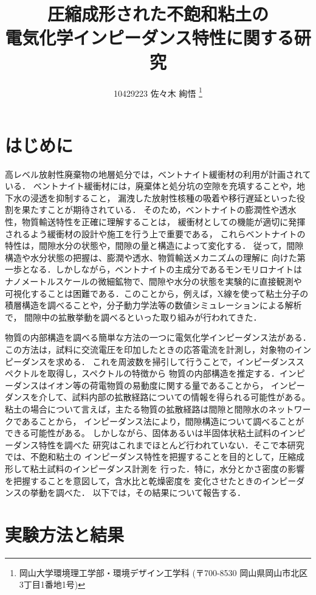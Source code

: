 \documentclass{jsce}
\title{
圧縮成形された不飽和粘土の\\
電気化学インピーダンス特性に関する研究
}%
\author{
10429223 佐々木 絢悟
\thanks{岡山大学環境理工学部・環境デザイン工学科 (〒700-8530 岡山県岡山市北区3丁目1番地1号)}
}
\begin{document}
\maketitle
\section{はじめに}
高レベル放射性廃棄物の地層処分では，ベントナイト緩衝材の利用が計画されている．
ベントナイト緩衝材には，廃棄体と処分坑の空隙を充填することや，地下水の浸透を抑制すること，
漏洩した放射性核種の吸着や移行遅延といった役割を果たすことが期待されている．
そのため，ベントナイトの膨潤性や透水性，物質輸送特性を正確に理解することは，
緩衝材としての機能が適切に発揮されるよう緩衝材の設計や施工を行う上で重要である，
これらベントナイトの特性は，間隙水分の状態や，間隙の量と構造によって変化する．
従って，間隙構造や水分状態の把握は、膨潤や透水、物質輸送メカニズムの理解に
向けた第一歩となる．しかしながら，ベントナイトの主成分であるモンモリロナイトは
ナノメートルスケールの微細鉱物で、間隙や水分の状態を実験的に直接観測や
可視化することは困難である．このことから，例えば，X線を使って粘土分子の
積層構造を調べることや，分子動力学法等の数値シミュレーションによる解析で，
間隙中の拡散挙動を調べるといった取り組みが行われてきた．

 物質の内部構造を調べる簡単な方法の一つに電気化学インピーダンス法がある．
この方法は，試料に交流電圧を印加したときの応答電流を計測し，対象物のインピーダンスを求める．
これを周波数を掃引して行うことで，インピーダンススペクトルを取得し，スペクトルの特徴から
物質の内部構造を推定する．インピーダンスはイオン等の荷電物質の易動度に関する量であることから，
インピーダンスを介して、試料内部の拡散経路についての情報を得られる可能性がある。
粘土の場合について言えば，主たる物質の拡散経路は間隙と間隙水のネットワークであることから，
インピーダンス法により，間隙構造について調べることができる可能性がある。
しかしながら、固体あるいは半固体状粘土試料のインピーダンス特性を調べた
研究はこれまでほとんど行われていない．そこで本研究では、不飽和粘土の
インピーダンス特性を把握することを目的として，圧縮成形して粘土試料のインピーダンス計測を
行った．特に，水分とかさ密度の影響を把握することを意図して，含水比と乾燥密度を
変化させたときのインピーダンスの挙動を調べた．
以下では，その結果について報告する．
\section{実験方法と結果}
\end{document}

